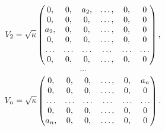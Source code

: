 \documentclass[12pt]{article}
\begin{document}
$$V_{2} = {\sqrt\kappa}\begin{pmatrix}0,     & 0     ,  & a_{2} ,  &\ldots ,  &0
,  &0\cr
                   0    , & 0     ,  &0 ,  &\ldots ,  &0 ,  &0\cr
                   a_{2}, & 0     ,  &0 ,  &\ldots ,  &0 ,  &0\cr
                   0    , & 0     ,  &0 ,  &\ldots ,  &0 ,  &0\cr
                   \ldots&\ldots   &\ldots&\ldots&\ldots&\ldots\cr
                   0    , & 0     ,  &0 ,  &\ldots ,  &0 ,  &0\end{pmatrix} , $$
\vspace{0.5cm} $$\ldots$$ \vspace{0.5cm}
$$V_{n} = {\sqrt\kappa}\begin{pmatrix}0,     & 0     ,  & 0 ,  &\ldots ,  &0 , 
&a_{n}\cr
                   0    , & 0     ,  &0 ,  &\ldots ,  &0 ,  &0\cr
                   \ldots&\ldots   &\ldots&\ldots&\ldots&\ldots\cr
                   0    , & 0     ,  &0 ,  &\ldots ,  &0 ,  &0\cr
                   a_{n}    , & 0     ,  &0 ,  &\ldots ,  &0 ,  &0\end{pmatrix} . $$
\end{document}
